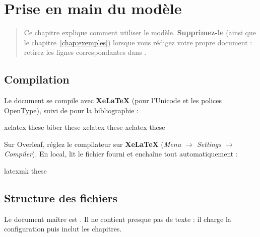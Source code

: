 \chapter{Prise en main du modèle}
\label{chap:prise-en-main}

\begin{quote}\small
Ce chapitre explique comment utiliser le modèle. \textbf{Supprimez-le}
(ainsi que le chapitre~\ref{chap:exemples}) lorsque vous rédigez votre
propre document : retirez les lignes \code{} correspondantes
dans .
\end{quote}

\section{Compilation}

Le document se compile avec \textbf{XeLaTeX} (pour l'Unicode et les polices
OpenType), suivi de  pour la bibliographie :

\begin{latexcode}
xelatex these
biber   these
xelatex these
xelatex these
\end{latexcode}

\noindent Sur Overleaf, réglez le compilateur sur \textbf{XeLaTeX}
(\emph{Menu $\rightarrow$ Settings $\rightarrow$ Compiler}). En local,  lit le
fichier  fourni et enchaîne tout automatiquement :

\begin{latexcode}
latexmk these
\end{latexcode}

\section{Structure des fichiers}

Le document maître est . Il ne contient presque pas de
texte : il charge la configuration puis inclut les chapitres.

